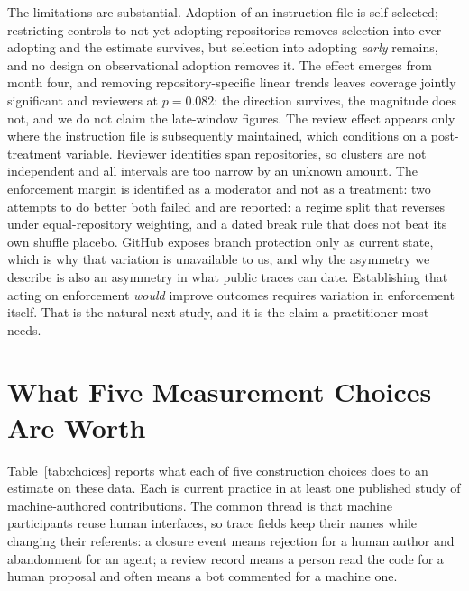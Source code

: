 \documentclass[mnsc]{informs4}
\begin{document}
The limitations are substantial. Adoption of an instruction file is self-selected;
restricting controls to not-yet-adopting repositories removes selection into
ever-adopting and the estimate survives, but selection into adopting \emph{early}
remains, and no design on observational adoption removes it. The effect emerges
from month four, and removing repository-specific linear trends leaves coverage
jointly significant and reviewers at $p=0.082$: the direction survives, the
magnitude does not, and we do not claim the late-window figures. The review effect
appears only where the instruction file is subsequently maintained, which
conditions on a post-treatment variable. Reviewer identities span repositories, so
clusters are not independent and all intervals are too narrow by an unknown amount. The enforcement margin is identified as a moderator and not as a treatment: two
attempts to do better both failed and are reported: a regime split that reverses
under equal-repository weighting, and a dated break rule that does not beat its own
shuffle placebo. GitHub exposes branch protection only as current state, which is
why that variation is unavailable to us, and why the asymmetry we describe is also
an asymmetry in what public traces can date. Establishing that acting on
enforcement \emph{would} improve outcomes requires variation in enforcement itself. That is the natural next study, and it is the claim a practitioner most needs.





\ECSwitch
\ECDisclaimer
{}

\section{What Five Measurement Choices Are Worth}
\label{ec:measurement}

Table~\ref{tab:choices} reports what each of five construction choices does to an
estimate on these data. Each is current practice in at least one published study of
machine-authored contributions. The common thread is that machine participants
reuse human interfaces, so trace fields keep their names while changing their
referents: a closure event means rejection for a human author and abandonment for
an agent; a review record means a person read the code for a human proposal and
often means a bot commented for a machine one.
\end{document}
